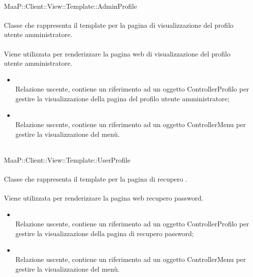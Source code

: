 \\
MaaP::Client::View::Template::AdminProfile\\
\\
Classe che rappresenta il template per la pagina di visualizzazione del profilo utente amministratore.\\
\\
Viene utilizzata per renderizzare la pagina web di visualizzazione del profilo utente amministratore.\\
\begin{itemize}
\item{}\\
Relazione uscente, contiene un riferimento ad un oggetto ControllerProfilo per gestire la visualizzazione della pagina del profilo utente amministratore;
\item{}\\
Relazione uscente, contiene un riferimento ad un oggetto ControllerMenu per gestire la visualizzazione del menù.
\end{itemize}

\\
MaaP::Client::View::Template::UserProfile\\
\\
Classe che rappresenta il template per la pagina di recupero .\\
\\
Viene utilizzata per renderizzare la pagina web recupero password.\\
\begin{itemize}
\item{}\\
Relazione uscente, contiene un riferimento ad un oggetto ControllerProfilo per gestire la visualizzazione della pagina di recupero password;
\item{}\\
Relazione uscente, contiene un riferimento ad un oggetto ControllerMenu per gestire la visualizzazione del menù.
\end{itemize}

